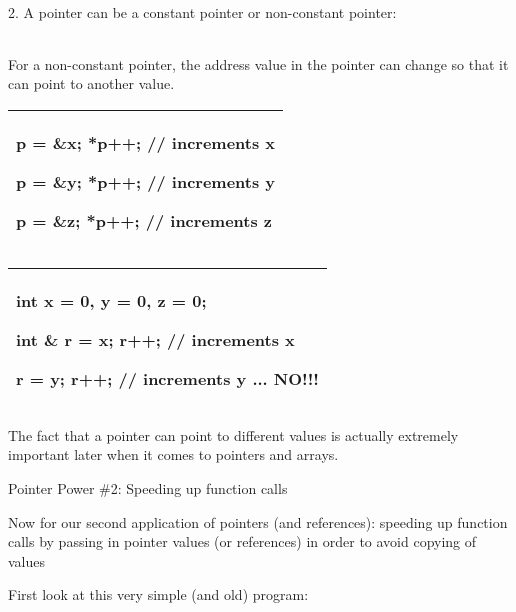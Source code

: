\documentclass[
]{article}
\begin{document}
2. A pointer can be a constant pointer or non-constant pointer:

\begin{longtable}[]{@{}l@{}}
\toprule
\endhead
\tabularnewline
\bottomrule
\end{longtable}

For a non-constant pointer, the address value in the pointer can change
so that it can point to another value.

\begin{longtable}[]{@{}l@{}}
\toprule
\endhead
\begin{minipage}[t]{0.97\columnwidth}\raggedright
p = \&x; *p++; // increments x

p = \&y; *p++; // increments y

p = \&z; *p++; // increments z\strut
\end{minipage}\tabularnewline
\bottomrule
\end{longtable}

\begin{longtable}[]{@{}l@{}}
\toprule
\endhead
\begin{minipage}[t]{0.97\columnwidth}\raggedright
int x = 0, y = 0, z = 0;

int \& r = x; r++; // increments x

r = y; r++; // increments y ... NO!!!\strut
\end{minipage}\tabularnewline
\bottomrule
\end{longtable}

The fact that a pointer can point to different values is actually
extremely important later when it comes to pointers and arrays.

Pointer Power \#2: Speeding up function calls

Now for our second application of pointers (and references): speeding up
function calls by passing in pointer values (or references) in order to
avoid copying of values

First look at this very simple (and old) program:
\end{document}
